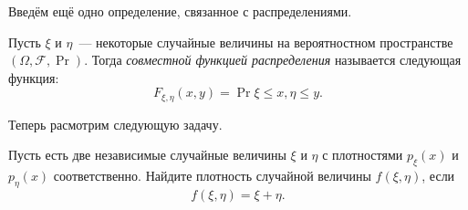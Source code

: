 Введём ещё одно определение, связанное с распределениями.
\begin{definition}
	Пусть \(\xi\) и \(\eta\)~--- некоторые случайные величины на вероятностном пространстве \((\Omega, \mathcal{F}, \Pr)\). Тогда \emph{совместной функцией распределения} называется следующая функция:
	\[F_{\xi, \eta}(x, y) = \Pr{\xi \leq x, \eta \leq y}.\]
\end{definition}

Теперь расмотрим следующую задачу.
\begin{problem}
	Пусть есть две независимые случайные величины \(\xi\) и \(\eta\) с плотностями \(p_{\xi}(x)\) и \(p_{\eta}(x)\) соответственно. Найдите плотность случайной величины \(f(\xi, \eta)\), если \[f(\xi, \eta) = \xi + \eta.\]
\end{problem}

